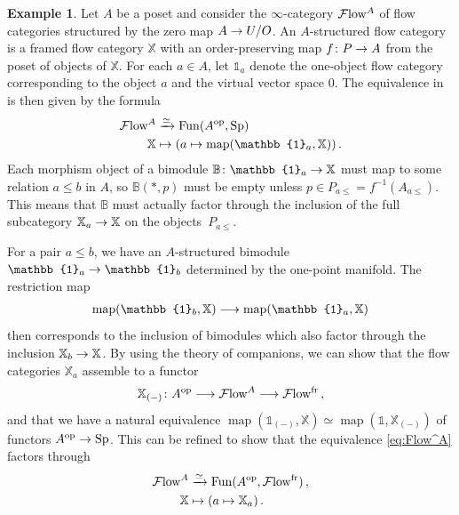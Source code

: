 \documentclass[10pt]{amsart}
\numberwithin{equation}{section}
\theoremstyle{definition}
\newtheorem{ex}[prop]{Example}
\DeclareMathOperator{\map}{map}
\DeclareMathOperator{\Fun}{Fun}
\DeclareMathOperator{\op}{op}
\newcommand{\fr}{\mathrm{fr}}
\newcommand{\Flow}{\cF\mathrm{low}\vphantom{w}}
\newcommand{\bB}{\mathbb{B}}
\newcommand{\bX}{\mathbb{X}}
\newcommand{\bOne}{\mathbb{1}}
\newcommand{\cF}{\mathcal{F}}
\newcommand{\Sp}{\mathrm{Sp}\vphantom{p}}
\renewcommand{\to}{\mathchoice{\longrightarrow}{\rightarrow}{}{}}
\begin{document}
\begin{ex}
	Let $A$ be a poset and consider the $\infty$-category $\Flow^{A}$ of flow categories structured by the zero map $A\to U/O$.
  An $A$-structured flow category is a framed flow category $\bX$ with an order-preserving map $f\colon P\to A$ from the poset of objects of $\bX$.
  For each $a\in A$, let $\bOne_{a}$ denote the one-object flow category corresponding to the object $a$ and the virtual vector space $0$.
  The equivalence in  is then given by the formula
	\begin{align}\label{eq:Flow^A}
		\Flow^{A} &\xrightarrow{\simeq} \Fun(A^{\op}, \Sp) \\
		\bX &\mapsto  (a\mapsto \map(\bOne_{a}, \bX) ) \,. \nonumber
	\end{align}
	Each morphism object of a bimodule $\bB\colon \bOne_{a} \to \bX$ must map to some relation $a\leq b$ in $A$, so $\bB(\ast, p)$ must be empty unless $p\in P_{a\leq} = f^{-1}(A_{a\leq})$.
	This means that $\bB$ must actually factor through the inclusion of the full subcategory $\bX_{a}\to \bX$ on the objects~$P_{a\leq}.$

	For a pair $a\leq b$, we have an $A$-structured bimodule $\bOne_{a}\to \bOne_{b}$ determined by the one-point manifold.
  The restriction map
	\begin{align*}
		\map(\bOne_{b},\bX) \to \map(\bOne_{a}, \bX)
	\end{align*}
	then corresponds to the inclusion of bimodules which also factor through the inclusion $\bX_{b} \to \bX$.
  By using the theory of companions, we can show that the flow categories $\bX_{a}$ assemble to a functor
	\begin{align*}
		\bX_{(-)} \colon A^{\op} \to \Flow^{A}\to \Flow^{\fr} \,,
	\end{align*}
	and that we have a natural equivalence $\map(\bOne_{(-)}, \bX ) \simeq \map(\bOne, \bX_{(-)})$ of functors $A^{\op}\to \Sp$.
  This can be refined to show that the equivalence \eqref{eq:Flow^A} factors through
	\begin{align*}
		\Flow^{A} &\xrightarrow{\simeq} \Fun(A^{\op}, \Flow^{\fr})\, ,  \\
		\bX &\mapsto (a\mapsto \bX_{a}) \,.
	\end{align*}
\end{ex}
\end{document}
